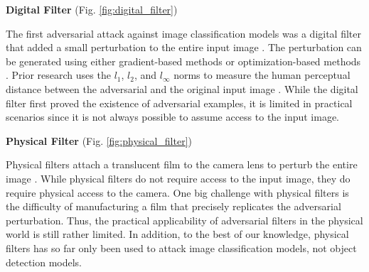\textbf{Digital Filter} (Fig. \ref{fig:digital_filter})

The first adversarial attack against image classification models was a digital filter that added a small perturbation to the entire input image \cite{goodfellow2014explaining}. The perturbation can be generated using either gradient-based methods \cite{madryMSTV18} \cite{kurakin2018adversarial} \cite{wong2019wasserstein} \cite{croce2020reliable} or optimization-based methods \cite{papernot2016transferability} \cite{carlini2017towards} \cite{qin2019imperceptible}. Prior research uses the $l_1$, $l_2$, and $l_{\infty}$ norms to measure the human perceptual distance between the adversarial and the original input image \cite{miyato2015distributional} \cite{sabour2015adversarial} \cite{chen2018ead}. While the digital filter first proved the existence of adversarial examples, it is limited in practical scenarios since it is not always possible to assume access to the input image.

\textbf{Physical Filter} (Fig. \ref{fig:physical_filter})

Physical filters attach a translucent film to the camera lens to perturb the entire image \cite{li2019adversarial}. While physical filters do not require access to the input image, they do require physical access to the camera. One big challenge with physical filters is the difficulty of manufacturing a film that precisely replicates the adversarial perturbation. Thus, the practical applicability of adversarial filters in the physical world is still rather limited. In addition, to the best of our knowledge, physical filters has so far only been used to attack image classification models, not object detection models. 


